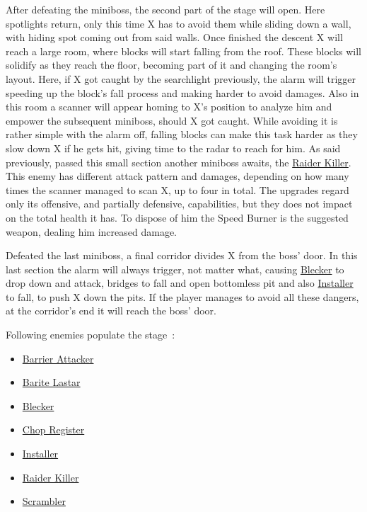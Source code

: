 After defeating the miniboss, the second part of the stage will open. Here spotlights return, only this time X has to avoid them while sliding down a wall, with hiding spot coming out from said walls. Once finished the descent X will reach a large room, where blocks will start falling from the roof. These blocks will solidify  as they reach the floor, becoming part of it and changing the room's layout. Here, if X got caught by the searchlight previously, the alarm will trigger speeding up the block's fall process and making harder to avoid damages. Also in this room a scanner will appear homing to X's position to analyze him and empower the subsequent miniboss, should X got caught. While avoiding it is rather simple with the alarm off, falling blocks can make this task harder as they slow down X if he gets hit, giving time to the radar to reach for him. As said previously, passed this small section another miniboss awaits, the \hyperlink{miniboss:Raider_Killer}{Raider Killer}. This enemy has different attack pattern and damages, depending on how many times the scanner managed to scan X, up to four in total. The upgrades regard only its offensive, and partially defensive, capabilities, but they does not impact on the total health it has. To dispose of him the Speed Burner is the suggested weapon, dealing him increased damage.

Defeated the last miniboss, a final corridor divides X from the boss' door. In this last section the alarm will always trigger, not matter what, causing \hyperlink{enem:Blecker}{Blecker} to drop down and attack, bridges to fall and open bottomless pit and also \hyperlink{enem:Installer}{Installer} to fall, to push X down the pits. If the player manages to avoid all these dangers, at the corridor's end it will reach the boss' door.

Following enemies populate the stage~\cite{wiki:Central_computer}:
\begin{itemize}
	\item \hyperlink{enem:Barrier_Attacker}{Barrier Attacker}
	\item \hyperlink{enem:Barite_Lastar}{Barite Lastar}
	\item \hyperlink{enem:Blecker}{Blecker}
	\item \hyperlink{miniboss:Chop_Register}{Chop Register}
	\item \hyperlink{enem:Installer}{Installer}
	\item \hyperlink{miniboss:Raider_Killer}{Raider Killer}
	\item \hyperlink{enem:Scrambler}{Scrambler}
\end{itemize}

